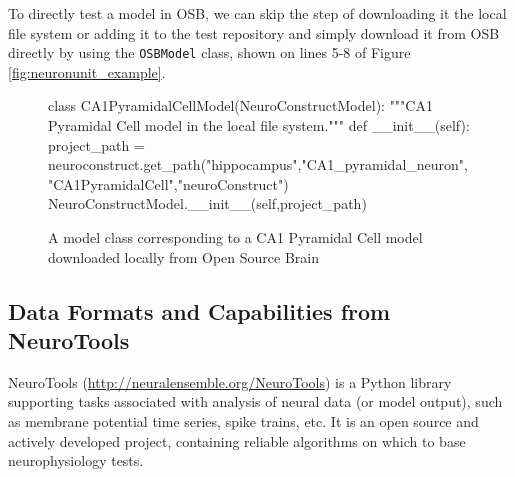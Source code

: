 \documentclass{frontiersSCNS}
\let\verbx\lstinline
\begin{document}
To directly test a model in OSB, we can skip the step of downloading it the local file system or adding it to the test repository and simply download it from OSB directly by using the \verbx{OSBModel} class, shown on lines 5-8 of Figure \ref{fig:neuronunit_example}. 


\begin{figure}
\begin{python}
class CA1PyramidalCellModel(NeuroConstructModel):
	"""CA1 Pyramidal Cell model in the local file system."""
	def __init__(self):
		project_path = neuroconstruct.get_path("hippocampus","CA1_pyramidal_neuron","CA1PyramidalCell","neuroConstruct")
		NeuroConstructModel.__init__(self,project_path)
\end{python}
\vspace{-15px}
\caption{A model class corresponding to a CA1 Pyramidal Cell model downloaded locally from Open Source Brain}
\label{fig:ca1_model}
\vspace{-10px}
\end{figure}

\subsection{Data Formats and Capabilities from NeuroTools}\label{sec:neurotools}
NeuroTools (\url{http://neuralensemble.org/NeuroTools}) is a Python library supporting tasks associated with analysis of neural data (or model output), such as membrane potential time series, spike trains, etc. 
It is an open source and actively developed project, containing reliable algorithms on which to base neurophysiology tests.
\end{document}

